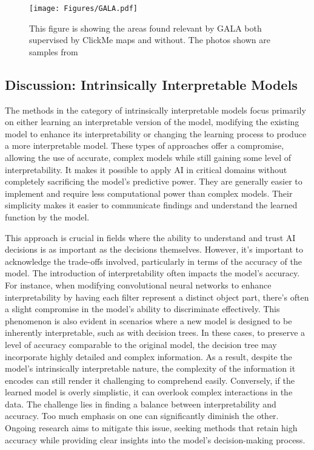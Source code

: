 \begin{figure}[ht!]
	\begin{center}
		\texttt{[image: Figures/GALA.pdf]}
	\end{center}
	\caption{This figure is showing the areas found relevant by GALA both supervised by ClickMe maps and without. The photos shown are samples from~\cite{LinsleySES19}}
	\label{Fig:GALA}
\end{figure} 

\subsection{Discussion: Intrinsically Interpretable Models}

The methods in the category of intrinsically interpretable models focus primarily on either learning an interpretable version of the model, modifying the existing model to enhance its interpretability or changing the learning process to produce a more interpretable model. These types of approaches offer a compromise, allowing the use of accurate, complex models while still gaining some level of interpretability. It makes it possible to apply AI in critical domains without completely sacrificing the model's predictive power. They are generally easier to implement and require less computational power than complex models. Their simplicity makes it easier to communicate findings and understand the learned function by the model.


This approach is crucial in fields where the ability to understand and trust AI decisions is as important as the decisions themselves. However, it's important to acknowledge the trade-offs involved, particularly in terms of the accuracy of the model. The introduction of interpretability often impacts the model's accuracy. For instance, when modifying convolutional neural networks to enhance interpretability by having each filter represent a distinct object part, there's often a slight compromise in the model's ability to discriminate effectively. This phenomenon is also evident in scenarios where a new model is designed to be inherently interpretable, such as with decision trees. In these cases, to preserve a level of accuracy comparable to the original model, the decision tree may incorporate highly detailed and complex information. As a result, despite the model's intrinsically interpretable nature, the complexity of the information it encodes can still render it challenging to comprehend easily. Conversely, if the learned model is overly simplistic, it can overlook complex interactions in the data. The challenge lies in finding a balance between interpretability and accuracy. Too much emphasis on one can significantly diminish the other. Ongoing research aims to mitigate this issue, seeking methods that retain high accuracy while providing clear insights into the model's decision-making process.

